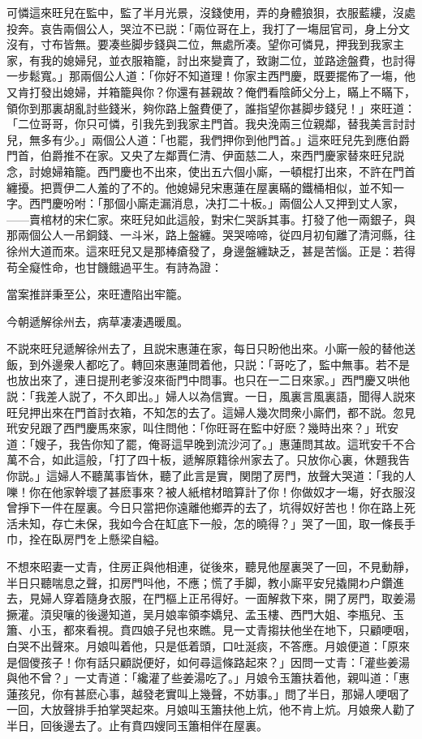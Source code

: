 可憐這來旺兒在監中，監了半月光景，沒錢使用，弄的身體狼狽，衣服藍縷，沒處投奔。哀告兩個公人，哭泣不已説：「兩位哥在上，我打了一塲屈官司，身上分文沒有，寸布皆無。要凑些脚步錢與二位，無處所凑。望你可憐見，押我到我家主家，有我的媳婦兒，並衣服箱籠，討出來變賣了，致謝二位，並路途盤費，也討得一步鬆寬。」那兩個公人道：「你好不知道理！你家主西門慶，既要擺佈了一塲，他又肯打發出媳婦，并箱籠與你？你還有甚親故？俺們看陰師父分上，瞞上不瞞下，領你到那裏胡亂討些錢米，夠你路上盤費便了，誰指望你甚脚步錢兒！」來旺道：「二位哥哥，你只可憐，引我先到我家主門首。我央浼兩三位親鄰，替我美言討討兒，無多有少。」兩個公人道：「也罷，我們押你到他門首。」這來旺兒先到應伯爵門首，伯爵推不在家。又央了左鄰賈仁清、伊面慈二人，來西門慶家替來旺兒説念，討媳婦箱籠。西門慶也不出來，使出五六個小廝，一頓棍打出來，不許在門首纏擾。把賈伊二人羞的了不的。他媳婦兒宋惠蓮在屋裏瞞的鐵桶相似，並不知一字。西門慶吩咐：「那個小廝走漏消息，决打二十板。」兩個公人又押到丈人家，——賣棺材的宋仁家。來旺兒如此這般，對宋仁哭訴其事。打發了他一兩銀子，與那兩個公人一吊銅錢、一斗米，路上盤纏。哭哭啼啼，従四月初旬離了清河縣，往徐州大道而來。這來旺兒又是那棒瘡發了，身邊盤纏缺乏，甚是苦惱。正是：若得苟全癡性命，也甘饑餓過平生。有詩為證：

當案推詳秉至公，來旺遭陷出牢籠。

今朝遞解徐州去，病草凄凄遇暖風。

不説來旺兒遞解徐州去了，且説宋惠蓮在家，每日只盼他出來。小廝一般的替他送飯，到外邊衆人都吃了。轉回來惠蓮問着他，只説：「哥吃了，監中無事。若不是也放出來了，連日提刑老爹沒來衙門中問事。也只在一二日來家。」西門慶又哄他説：「我差人説了，不久即出。」婦人以為信實。一日，風裏言風裏語，聞得人説來旺兒押出來在門首討衣箱，不知怎的去了。這婦人幾次問衆小廝們，都不説。忽見玳安兒跟了西門慶馬來家，叫住問他：「你旺哥在監中好麽？幾時出來？」玳安道：「嫂子，我告你知了罷，俺哥這早晚到流沙河了。」惠蓮問其故。這玳安千不合萬不合，如此這般，「打了四十板，遞解原籍徐州家去了。只放你心裏，休題我告你説。」這婦人不聽萬事皆休，聽了此言是實，関閉了房門，放聲大哭道：「我的人嚛！你在他家幹壞了甚麽事來？被人紙棺材暗算計了你！你做奴才一塲，好衣服沒曾掙下一件在屋裏。今日只當把你遠離他鄉弄的去了，坑得奴好苦也！你在路上死活未知，存亡未保，我如今合在缸底下一般，怎的曉得？」哭了一囬，取一條長手巾，拴在臥房門を上懸梁自縊。

不想來昭妻一丈青，住房正與他相連，従後來，聽見他屋裏哭了一回，不見動靜，半日只聽喘息之聲，扣房門呌他，不應；慌了手脚，教小廝平安兒撬開わ户鑽進去，見婦人穿着隨身衣服，在門樞上正吊得好。一面解救下來，開了房門，取姜湯撅灌。湏臾嚷的後邊知道，吴月娘率領李嬌兒、孟玉樓、西門大姐、李瓶兒、玉簫、小玉，都來看視。賁四娘子兒也來瞧。見一丈青搊扶他坐在地下，只顧哽咽，白哭不出聲來。月娘叫着他，只是低着頭，口吐涎痰，不答應。月娘便道：「原來是個儍孩子！你有話只顧説便好，如何尋這條路起來？」因問一丈青：「灌些姜湯與他不曾？」一丈青道：「纔灌了些姜湯吃了。」月娘令玉簫扶着他，親叫道：「惠蓮孩兒，你有甚麽心事，越發老實叫上幾聲，不妨事。」問了半日，那婦人哽咽了一回，大放聲排手拍掌哭起來。月娘叫玉簫扶他上炕，他不肯上炕。月娘衆人勸了半日，回後邊去了。止有賁四嫂同玉簫相伴在屋裏。

